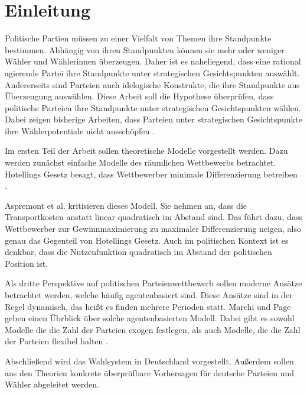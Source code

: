 
\chapter{Einleitung}\label{Kap-Einleitung}
Politische Partien müssen zu einer Vielfalt von Themen ihre Standpunkte bestimmen. Abhängig von ihren Standpunkten können sie mehr oder weniger Wähler und Wählerinnen überzeugen. Daher ist es naheliegend, dass eine rational agierende Partei ihre Standpunkte unter strategischen Gesichtspunkten auswählt. Andererseits sind Parteien auch idelogische Konstrukte, die ihre Standpunkte aus Überzeugung auswählen. Diese Arbeit soll die Hypothese überprüfen, dass politische Parteien ihre Standpunkte unter strategischen Gesichtspunkten wählen. Dabei zeigen bisherige Arbeiten, dass Parteien unter strategischen Gesichtspunkte ihre Wählerpotentiale nicht ausschöpfen \citep{schofield1998germany}.

Im ersten Teil der Arbeit sollen theoretische Modelle vorgestellt werden. Dazu werden  zunächst einfache Modelle des räumlichen Wettbewerbs betrachtet. Hotellings Gesetz besagt, dass Wettbewerber minimale Differenzierung betreiben \citep{hotelling1929}.

Aspremont et al. \citep{aspremont1979} kritisieren dieses Modell. Sie nehmen an, dass die Transportkosten anstatt linear quadratisch im Abstand sind. Das führt dazu, dass Wettbewerber zur Gewinnmaximierung zu maximaler Differenzierung neigen, also genau das Gegenteil von Hotellings Gesetz. Auch im politischen Kontext ist es denkbar, dass die Nutzenfunktion quadratisch im Abstand der politischen Position ist.

Als dritte Perspektive auf politischen Parteienwettbewerb sollen moderne Ansätze betrachtet werden, welche häufig agentenbasiert sind. Diese Ansätze sind in der Regel dynamisch, das heißt es finden mehrere Perioden statt. Marchi und Page \citep{marchi2014ABMs} geben einen Übrblick über solche agentenbasierten Modell. Dabei gibt es sowohl Modelle die die Zahl der Parteien exogen festlegen, als auch Modelle, die die Zahl der Parteien flexibel halten \citep{laver2007endogenousParties}.

Abschließend wird das Wahlsystem in Deutschland vorgestellt. Außerdem sollen aus den Theorien konkrete überprüfbare Vorhersagen für deutsche Parteien und Wähler abgeleitet werden.

